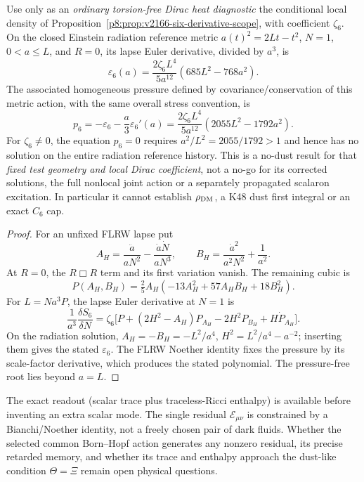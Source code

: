 \documentclass[12pt,a4paper]{article}
\begin{document}
\begin{proposition}
\label{p8:prop:v2167-a6-no-dust-test}
Use only as an \emph{ordinary torsion-free Dirac heat diagnostic} the
conditional local density of
Proposition~\ref{p8:prop:v2166-six-derivative-scope}, with coefficient
\(\zeta_6\).  On the closed Einstein radiation reference metric
\(a(t)^2=2Lt-t^2\), \(N=1\), \(0<a\le L\), and \(R=0\),
its lapse Euler derivative, divided by \(a^3\), is
\[
 \varepsilon_6(a)=\frac{2\zeta_6 L^4}{5a^{12}}
 (685L^2-768a^2).
\]
The associated homogeneous pressure defined by covariance/conservation
of this metric action, with the same overall stress convention, is
\[
 \boxed{p_6=-\varepsilon_6-\frac a3\varepsilon_6'(a)
 =\frac{2\zeta_6L^4}{5a^{12}}(2055L^2-1792a^2).}
\]
For \(\zeta_6\ne0\), the equation \(p_6=0\) requires
\(a^2/L^2=2055/1792>1\) and hence has no solution on the
entire radiation reference history.  This is a no-dust result for that
\emph{fixed test geometry and local Dirac coefficient}, not a no-go for
its corrected solutions, the full nonlocal joint action or a separately
propagated scalaron excitation.  In particular it cannot establish
\(\rho_{\rm DM}\), a K48 dust first integral or an exact \(C_6\) cap.
\end{proposition}
\begin{proof}
For an unfixed FLRW lapse put
\[
 A_H=\frac{\ddot a}{aN^2}-\frac{\dot a\dot N}{aN^3},
 \qquad B_H=\frac{\dot a^2}{a^2N^2}+\frac1{a^2}.
\]
At \(R=0\), the
\(R\Box R\) term and its first variation vanish.  The remaining
cubic is
\[
 P(A_H,B_H)=\tfrac25 A_H(-13A_H^2+57A_HB_H+18B_H^2).
\]
For \(L=Na^3P\), the lapse Euler derivative at \(N=1\) is
\[
 \frac1{a^3}\frac{\delta S_6}{\delta N}
 =\zeta_6\bigl[P+(2H^2-A_H)P_{A_H}-2H^2P_{B_H}
 +H\dot P_{A_H}\bigr].
\]
On the radiation solution, \(A_H=-B_H=-L^2/a^4\),
\(H^2=L^2/a^4-a^{-2}\); inserting them gives the stated
\(\varepsilon_6\).  The FLRW Noether identity fixes the pressure by
its scale-factor derivative, which produces the stated polynomial.
The pressure-free root lies beyond \(a=L\).
\end{proof}
\begin{remark}
The exact readout (scalar trace plus traceless-Ricci enthalpy) is available
before inventing an extra scalar mode.  The single residual
\(\mathcal E_{\mu\nu}\) is constrained by a Bianchi/Noether identity,
not a freely chosen pair of dark fluids.  Whether the selected common
Born--Hopf action generates any nonzero residual, its precise retarded
memory, and whether its trace and enthalpy approach the dust-like
condition \(\Theta=\Xi\) remain open physical questions.
\end{remark}
\end{document}
